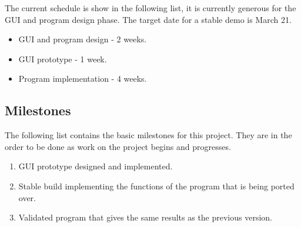 \documentclass[12pt,letterpaper]{article}
\begin{document}
The current schedule is show in the following list, it is currently generous for the GUI and program design phase. The target date for a stable demo is March 21.

\begin{itemize}

\item GUI and program design - 2 weeks.
\item GUI prototype - 1 week.
\item Program implementation - 4 weeks.

\end{itemize}

\subsection{Milestones}

The following list contains the basic milestones for this project. They are in the order to be done as work on the project begins and progresses.

\begin{enumerate}

\item GUI prototype designed and implemented.
\item Stable build implementing the functions of the program that is being ported over.
\item Validated program that gives the same results as the previous version.

\end{enumerate}
\end{document}
